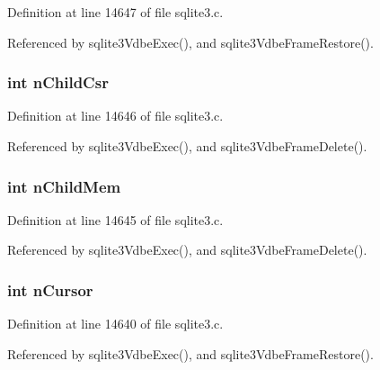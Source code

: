 Definition at line 14647 of file sqlite3.\+c.



Referenced by sqlite3\+Vdbe\+Exec(), and sqlite3\+Vdbe\+Frame\+Restore().

\hypertarget{struct_vdbe_frame_a02ffedf6eb36618010bd2d4dba030bc8}{}
\subsubsection[{n\+Child\+Csr}]{\setlength{\rightskip}{0pt plus 5cm}int n\+Child\+Csr}\label{struct_vdbe_frame_a02ffedf6eb36618010bd2d4dba030bc8}


Definition at line 14646 of file sqlite3.\+c.



Referenced by sqlite3\+Vdbe\+Exec(), and sqlite3\+Vdbe\+Frame\+Delete().

\hypertarget{struct_vdbe_frame_a9c084a923065e168ff226201223a6c2d}{}
\subsubsection[{n\+Child\+Mem}]{\setlength{\rightskip}{0pt plus 5cm}int n\+Child\+Mem}\label{struct_vdbe_frame_a9c084a923065e168ff226201223a6c2d}


Definition at line 14645 of file sqlite3.\+c.



Referenced by sqlite3\+Vdbe\+Exec(), and sqlite3\+Vdbe\+Frame\+Delete().

\hypertarget{struct_vdbe_frame_abd18ebaf2ce9128e5e45bd424af27002}{}
\subsubsection[{n\+Cursor}]{\setlength{\rightskip}{0pt plus 5cm}int n\+Cursor}\label{struct_vdbe_frame_abd18ebaf2ce9128e5e45bd424af27002}


Definition at line 14640 of file sqlite3.\+c.



Referenced by sqlite3\+Vdbe\+Exec(), and sqlite3\+Vdbe\+Frame\+Restore().

\hypertarget{struct_vdbe_frame_a1efef3b338ec76df8eb738429ca474c0}{}
